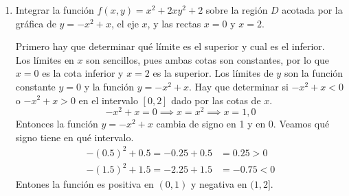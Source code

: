 \documentclass{article}
\begin{document}
\begin{enumerate}
    \pagebreak
    \item {
        Integrar la función $f(x,y) = x^2 + 2xy^2 + 2$ sobre la región $D$
        acotada por la gráfica de $y = -x^2 + x$, el eje $x$, y las rectas
        $x = 0$ y $x = 2$.

        \color{azul}
				Primero hay que determinar qué límite es el superior y cual es el inferior.\\
				Los límites en $x$ son sencillos, pues ambas cotas son constantes, por lo
				que $x = 0$ es la cota inferior y $x = 2$ es la superior.
				Los límites de $y$ son la función constante $y = 0$ y la función
				$y = -x^2 + x$. Hay que determinar si  $-x^2 + x < 0 $ o $-x^2 + x > 0 $
				en el intervalo $[0, 2]$ dado por las cotas de $x$.
        \[-x^2 + x = 0 \implies x = x^2 \implies x = 1, 0\]
        Entonces la función $y = -x^2 + x$ cambia de signo en 1 y en 0. Veamos
        qué signo tiene en qué intervalo.
        \begin{align*}
            -(0.5)^2 + 0.5 = -0.25 + 0.5 & = 0.25 > 0 \\
            -(1.5)^2 + 1.5 = -2.25 + 1.5 & = -0.75 < 0
        \end{align*}
        Entones la función es positiva en $(0, 1)$ y negativa en $(1, 2]$.

}
\end{enumerate}
\end{document}
